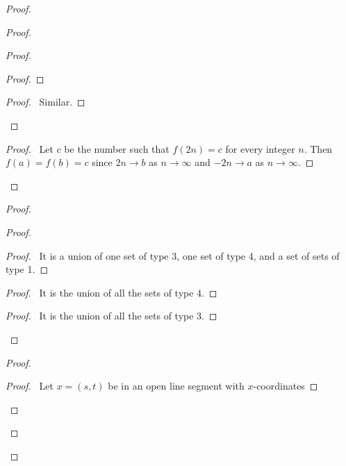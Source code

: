 \begin{example}[Choice]
\begin{proof}
\begin{proof}
\begin{proof}
\begin{proof}
                \end{proof}
                \begin{proof}
                    \pf\ Similar.
                \end{proof}
            \end{proof}
            \begin{proof}
                \pf\ Let $c$ be the number such that $f(2n) = c$ for every integer $n$.
                Then $f(a) = f(b) = c$ since $2n \rightarrow b$ as $n \rightarrow \infty$
                and $-2n \rightarrow a$ as $n \rightarrow \infty$.
            \end{proof}
        \end{proof}
        \begin{proof}
            \begin{proof}
                \begin{proof}
                    \pf\ It is a union of one set of type 3, one set of type 4,
                    and a set of sets of type 1.
                \end{proof}
                \begin{proof}
                    \pf\ It is the union of all the sets of type 4.
                \end{proof}
                \begin{proof}
                    \pf\ It is the union of all the sets of type 3.
                \end{proof}
            \end{proof}
            \begin{proof}
                \begin{proof}
                    \pf\ Let $x = (s,t)$ be in an open line segment with $x$-coordinates

\end{proof}
\end{proof}
\end{proof}
\end{proof}
\end{example}
